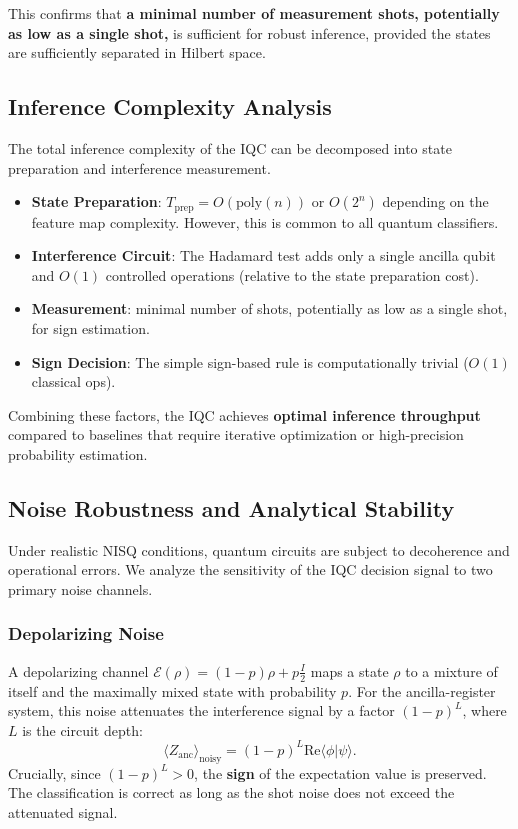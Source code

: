 \documentclass[conference]{IEEEtran}
\begin{document}
This confirms that \textbf{a minimal number of measurement shots, potentially as low as a single shot,} is sufficient for robust inference, provided the states are sufficiently separated in Hilbert space.

\subsection{Inference Complexity Analysis}

The total inference complexity of the IQC can be decomposed into state preparation and interference measurement.
\begin{itemize}
    \item \textbf{State Preparation}: $T_{\text{prep}} = O(\text{poly}(n))$ or $O(2^n)$ depending on the feature map complexity. However, this is common to all quantum classifiers.
    \item \textbf{Interference Circuit}: The Hadamard test adds only a single ancilla qubit and $O(1)$ controlled operations (relative to the state preparation cost).
    \item \textbf{Measurement}: minimal number of shots, potentially as low as a single shot, for sign estimation.
    \item \textbf{Sign Decision}: The simple sign-based rule is computationally trivial ($O(1)$ classical ops).
\end{itemize}
Combining these factors, the IQC achieves \textbf{optimal inference throughput} compared to baselines that require iterative optimization or high-precision probability estimation.

\subsection{Noise Robustness and Analytical Stability}

Under realistic NISQ conditions, quantum circuits are subject to decoherence and operational errors. We analyze the sensitivity of the IQC decision signal to two primary noise channels.

\subsubsection{Depolarizing Noise}
A depolarizing channel $\mathcal{E}(\rho) = (1-p)\rho + p\frac{I}{2}$ maps a state $\rho$ to a mixture of itself and the maximally mixed state with probability $p$. For the ancilla-register system, this noise attenuates the interference signal by a factor $(1-p)^L$, where $L$ is the circuit depth:
\begin{equation}
    \langle Z_{\text{anc}} \rangle_{\text{noisy}} = (1-p)^L \mathrm{Re}\langle \phi | \psi \rangle.
\end{equation}
Crucially, since $(1-p)^L > 0$, the \textbf{sign} of the expectation value is preserved. The classification is correct as long as the shot noise does not exceed the attenuated signal.
\end{document}
